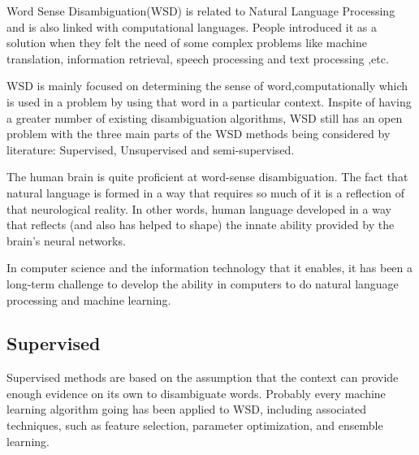 Word Sense Disambiguation(WSD) is related to Natural Language Processing and is also linked with computational languages. 
People introduced it as a solution when they felt the need of some complex problems like machine translation, information retrieval, speech processing and text processing ,etc. 

WSD is mainly focused on determining the sense of word,computationally which is used in a problem by using that word in a particular context. 
Inspite of having a greater number of existing disambiguation algorithms, WSD still has an open problem with the three main parts of the WSD methods being considered by literature: Supervised, Unsupervised and semi-supervised. 

The human brain is quite proficient at word-sense disambiguation. 
The fact that natural language is formed in a way that requires so much of it is a reflection of that neurological reality. 
In other words, human language developed in a way that reflects (and also has helped to shape) the innate ability provided by the brain's neural networks. 

In computer science and the information technology that it enables, it has been a long-term challenge to develop the ability in computers to do natural language processing and machine learning. 

\subsection*{Supervised}

Supervised methods are based on the assumption that the context can provide enough evidence on its own to disambiguate words. 
Probably every machine learning algorithm going has been applied to WSD, including associated techniques, such as feature selection, parameter optimization, and ensemble learning.

